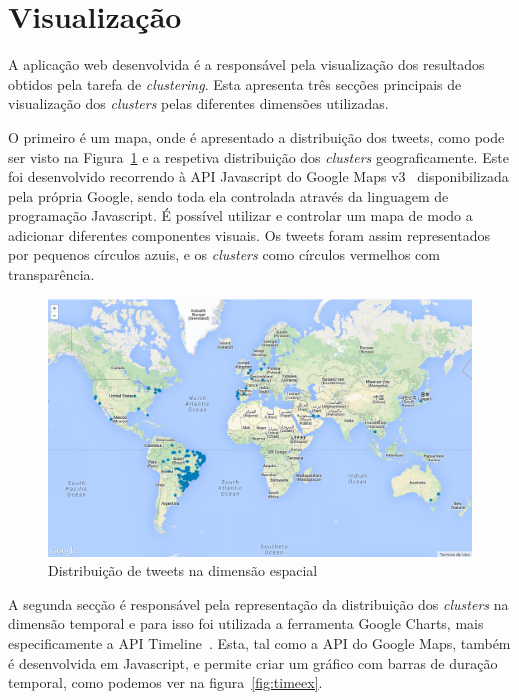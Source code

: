 \section{Visualização}

A aplicação web desenvolvida é a responsável pela visualização dos resultados obtidos pela tarefa de \textit{clustering}. Esta apresenta três secções principais de visualização dos \textit{clusters} pelas diferentes dimensões utilizadas. 

O primeiro é um mapa, onde é apresentado a distribuição dos tweets, como pode ser visto na Figura~\ref{fig:map1} e a respetiva distribuição dos \textit{clusters} geograficamente. Este foi desenvolvido recorrendo à API Javascript do Google Maps v3~\cite{googlemapsapi} disponibilizada pela própria Google, sendo toda ela controlada através da linguagem de programação Javascript. É possível utilizar e controlar um mapa de modo a adicionar diferentes componentes visuais. Os tweets foram assim representados por pequenos círculos azuis, e os \textit{clusters} como círculos vermelhos com transparência. 

\begin{figure}[h]
\centering
\includegraphics[width=1.0\linewidth]{./figures/olhopassarinho/map1.png}
\caption{Distribuição de tweets na dimensão espacial}
\label{fig:map1}
\end{figure}

A segunda secção é responsável pela representação da distribuição dos \textit{clusters} na dimensão temporal e para isso foi utilizada a ferramenta Google Charts, mais especificamente a API Timeline~\cite{googletimeline}. Esta, tal como a API do Google Maps, também é desenvolvida em Javascript, e permite criar um gráfico com barras de duração temporal, como podemos ver na figura~\ref{fig:timeex}. 

